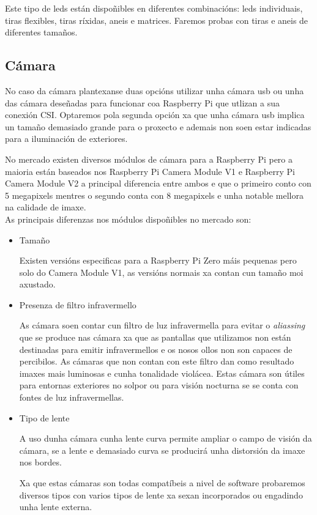 Este tipo de leds están dispoñibles en diferentes combinacións: leds individuais, tiras flexibles, tiras ríxidas, aneis e matrices. Faremos probas con tiras e aneis de diferentes tamaños.


\subsection{Cámara}

No caso da cámara plantexanse duas opcións utilizar unha cámara usb ou unha das cámara deseñadas para funcionar coa Raspberry Pi que utlizan a sua conexión CSI. Optaremos pola segunda opción xa que unha cámara usb implica un tamaño demasiado grande para o proxecto e ademais non soen estar indicadas para a iluminación de exteriores.

No mercado existen diversos módulos de cámara para a Raspberry Pi pero a maioria están baseados nos Raspberry Pi Camera Module V1 e Raspberry Pi Camera Module V2 a principal diferencia entre ambos e que o primeiro conto con 5 megapixels mentres o segundo conta con 8 megapixels e unha notable mellora na calidade de imaxe.\\

As principais diferenzas nos módulos dispoñibles no mercado son:
\begin{itemize}
    \item Tamaño

Existen versións especificas para a Raspberry Pi Zero máis pequenas pero solo do Camera Module V1, as versións normais xa contan cun tamaño moi axustado.

    \item Presenza de filtro infravermello

As cámara soen contar cun filtro de luz infravermella para evitar o \emph{aliassing} que se produce nas cámara xa que as pantallas que utilizamos non están destinadas para emitir infravermellos e os nosos ollos non son capaces de percibilos. As cámaras que non contan con este filtro dan como resultado imaxes mais luminosas e cunha tonalidade violácea. Estas cámara son útiles para entornas exteriores no solpor ou para visión nocturna se se conta con fontes de luz infravermellas.

    \item Tipo de lente

A uso dunha cámara cunha lente curva permite ampliar o campo de visión da cámara, se a lente e demasiado curva se producirá unha distorsión da imaxe nos bordes.

Xa que estas cámaras son todas compatíbeis a nivel de software probaremos diversos tipos con varios tipos de lente xa sexan incorporados ou engadindo unha lente externa.
\end{itemize}




